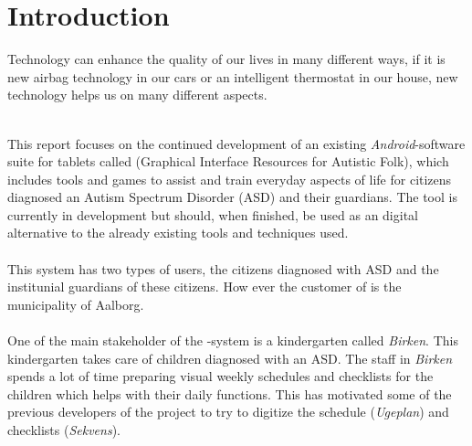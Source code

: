 \chapter{Introduction}
\label{cha:introduction}

Technology can enhance the quality of our lives in many different ways, if it is new airbag technology in our cars or an intelligent thermostat in our house, new technology helps us on many different aspects. 
\\\\

This report focuses on the continued development of an existing \emph{Android}-software suite for tablets called \giraf (Graphical Interface Resources for Autistic Folk), which includes tools and games to assist and train everyday aspects of life for citizens diagnosed an Autism Spectrum Disorder (ASD) \parencite{asd} and their guardians. The tool is currently in development but should, when finished, be used as an digital alternative to the already existing tools and techniques used. 
\\\\
This system has two types of users, the citizens diagnosed with ASD and the institunial guardians of these citizens. How ever the customer of \giraf is the municipality of Aalborg.
\\\\
One of the main stakeholder of the \giraf-system is a kindergarten called \emph{Birken}. This kindergarten takes care of children diagnosed with an ASD. The staff in \emph{Birken} spends a lot of time preparing visual weekly schedules and checklists for the children which helps with their daily functions. This has motivated some of the previous developers of the \giraf project to try to digitize the schedule (\emph{Ugeplan}) and checklists (\emph{Sekvens}). 
\\\\



